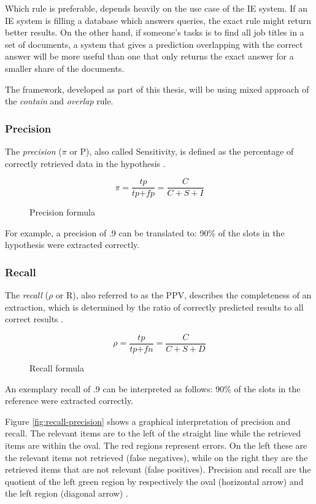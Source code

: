 Which rule is preferable, depends heavily on the use case of the \gls{IE} system. If an \gls{IE} system is filling a database which answers queries, the exact rule might return better results. On the other hand, if someone's tasks is to find all job titles in a set of documents, a system that gives a prediction overlapping with the correct answer will be more useful than one that only returns the exact answer for a smaller share of the documents. \cite{Sitter:2004}

The framework, developed as part of this thesis, will be using mixed approach of the \textit{contain} and \textit{overlap} rule.

\subsubsection{Precision}
The \textit{precision} (\ensuremath{\pi} or P), also called Sensitivity, is defined as the percentage of correctly retrieved data in the hypothesis \cite{Carstensen:2010}. 

\begin{figure}[H]
\begin{displaymath}
	\pi = \frac{\textit{tp}}{\textit{tp} + \textit{fp}} = \frac{C}{C+S+I}
\end{displaymath}
\caption{Precision formula}
\end{figure}

For example, a precision of .9 can be translated to: 90\% of the slots in the hypothesis were extracted correctly.

\subsubsection{Recall}
The \textit{recall} (\ensuremath{\rho} or R), also referred to as the \gls{PPV}, describes the completeness of an extraction, which is determined by the ratio of correctly predicted results to all correct results \cite{Carstensen:2010}.

\begin{figure}[H]
\begin{displaymath}
	\rho = \frac{\textit{tp}}{\textit{tp} + \textit{fn}} = \frac{C}{C+S+D}
\end{displaymath}
\caption{Recall formula}
\end{figure}

An exemplary recall of .9 can be interpreted as follows: 90\% of the slots in the reference were extracted correctly.

Figure \ref{fig:recall-precision} shows a graphical interpretation of precision and recall. The relevant items are to the left of the straight line while the retrieved items are within the oval. The red regions represent errors. On the left these are the relevant items not retrieved (false negatives), while on the right they are the retrieved items that are not relevant (false positives). Precision and recall are the quotient of the left green region by respectively the oval (horizontal arrow) and the left region (diagonal arrow) \cite{Wikipedia:Precision_and_recall}.

